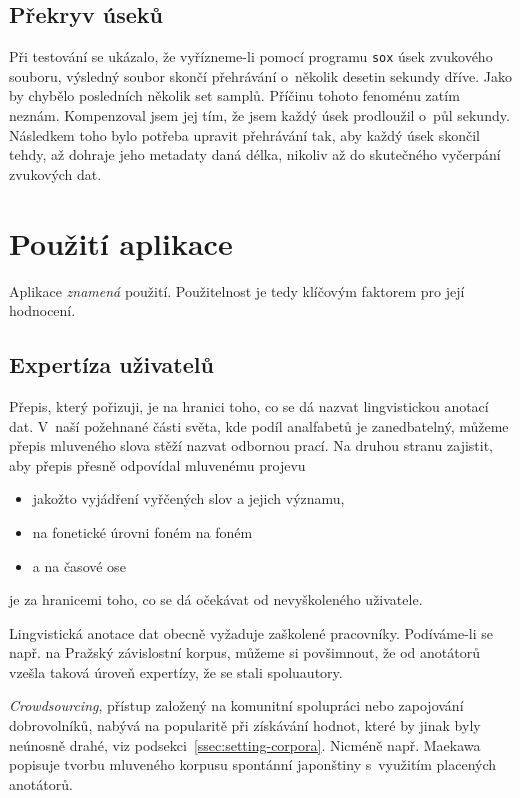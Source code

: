 \subsection{Překryv úseků}

Při testování se ukázalo, že vyřízneme-li pomocí programu \texttt{sox} úsek
zvukového souboru, výsledný soubor skončí přehrávání o~několik desetin sekundy
dříve. Jako by chybělo posledních několik set samplů. Příčinu tohoto fenoménu
zatím neznám. Kompenzoval jsem jej tím, že jsem každý úsek prodloužil o~půl
sekundy. Následkem toho bylo potřeba upravit přehrávání tak, aby každý úsek
skončil tehdy, až dohraje jeho metadaty daná délka, nikoliv až do skutečného
vyčerpání zvukových dat.


\section{Použití aplikace}

Aplikace {\em znamená} použití. Použitelnost je tedy klíčovým faktorem pro její hodnocení.

\subsection{Expertíza uživatelů}

Přepis, který pořizuji, je na hranici toho, co se dá nazvat lingvistickou
anotací dat. V~naší požehnané části světa, kde podíl analfabetů je zanedbatelný,
můžeme přepis mluveného slova stěží nazvat odbornou prací. Na druhou stranu zajistit, aby
přepis přesně odpovídal mluvenému projevu
\begin{itemize}
\item{jakožto vyjádření vyřčených slov a jejich významu,}
\item{na fonetické úrovni foném na foném}
\item{a na časové ose}
\end{itemize}
je za hranicemi toho, co se dá očekávat od nevyškoleného uživatele.

Lingvistická anotace dat obecně vyžaduje zaškolené pracovníky. Podíváme-li se
např. na Pražský závislostní korpus, můžeme si povšimnout, že od anotátorů
vzešla taková úroveň expertízy, že se stali spoluautory\cite{hajivc2005complex}.

{\em Crowdsourcing}, přístup založený na komunitní spolupráci nebo zapojování
dobrovolníků, nabývá na popularitě při získávání hodnot, které by jinak byly
neúnosně drahé, viz podsekci~\ref{ssec:setting-corpora}. Nicméně např.
Maekawa\cite{maekawa2000spontaneous} popisuje tvorbu
mluveného korpusu spontánní japonštiny s~využitím placených anotátorů.

